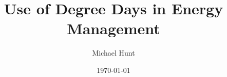 \documentclass{article}
\begin{document}
\title{Use of Degree Days in Energy Management}
\author{Michael Hunt}
\date{\today}
\maketitle

\end{document}
